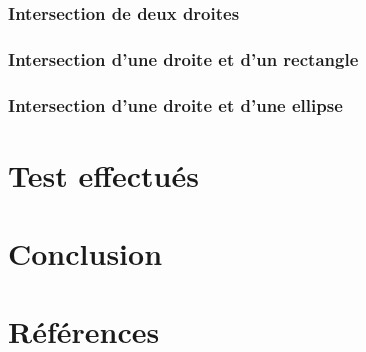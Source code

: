 \documentclass[a4paper,11pt]{report}
\begin{document}
\subsection[Deux droites]{Intersection de deux droites}
\subsection[Droite et rectangle]{Intersection d'une droite et d'un rectangle}
\subsection[Droite et ellipse]{Intersection d'une droite et d'une ellipse}



\chapter{Test effectués}



\chapter{Conclusion}


\appendix


\chapter{Références}
\end{document}
